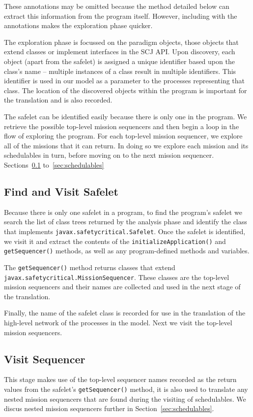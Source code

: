 \documentclass[10pt,a4paper]{article}
\begin{document}
These annotations may be omitted because the method detailed below can extract this information from the program itself. However, including with the annotations makes the exploration phase quicker. 

The exploration phase is focussed on the paradigm objects, those objects that extend classes or implement interfaces in the SCJ API. Upon discovery, each object (apart from the safelet) is assigned a unique identifier based upon the class's name -- multiple instances of a class result in multiple identifiers. This identifier is used in our model as a parameter to the processes representing that class. The location of the discovered objects within the program is important for the translation and is also recorded.

The safelet can be identified easily because there is only one in the program. We retrieve the possible top-level mission sequencers and then begin a loop in the flow of exploring the program. For each top-level mission sequencer, we explore all of the missions that it can return. In doing so we explore each mission and its schedulables in turn, before moving on to the next mission sequencer. Sections~\ref{sec:safelet} to~\ref{sec:schedulables} 

\subsection{Find and Visit Safelet}
\label{sec:safelet}

Because there is only one safelet in a program, to find the program's safelet we search the list of class trees returned by the analysis phase and identify the class that implements \texttt{javax.safetycritical.Safelet}. Once the safelet is identified, we visit it and extract the contents of the \texttt{initializeApplication()} and \texttt{getSequencer()} methods, as well as any program-defined methods and variables. 

The \texttt{getSequencer()} method returns classes that extend \texttt{javax.safetycritical.MissionSequencer}. These classes are the top-level mission sequencers and their names are collected and used in the next stage of the translation. 

Finally, the name of the safelet class is recorded for use in the translation of the high-level network of the processes in the model. Next we visit the top-level mission sequencers.

\subsection{Visit Sequencer}
\label{sec:sequencer}
This stage makes use of the top-level sequencer names recorded as the return values from the safelet's \texttt{getSequencer()} method, it is also used to translate any nested mission sequencers that are found during the visiting of schedulables. We discus nested mission sequencers further in Section~\ref{sec:schedulables}.
\end{document}
